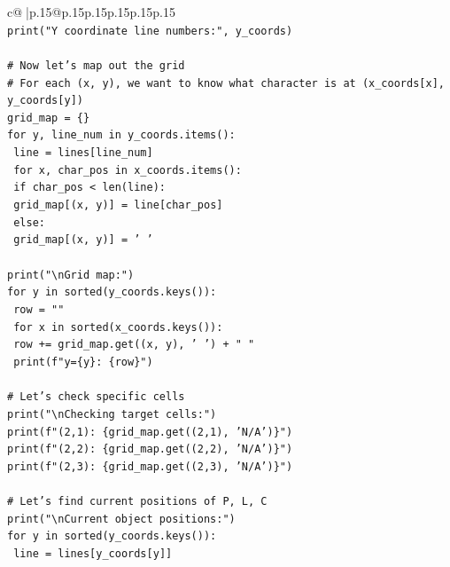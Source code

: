 \documentclass{article}
\begin{document}
{\begin{supertabular}{c@{$\;$}|p{.15\linewidth}@{}p{.15\linewidth}p{.15\linewidth}p{.15\linewidth}p{.15\linewidth}p{.15\linewidth}}
{{{\\ 
\texttt{print("Y coordinate line numbers:", y\_coords)} \\
\\ 
\texttt{\# Now let's map out the grid} \\
\texttt{\# For each (x, y), we want to know what character is at (x\_coords{[}x{]}, y\_coords{[}y{]})} \\
\texttt{grid\_map = \{\}} \\
\texttt{for y, line\_num in y\_coords.items():} \\
\texttt{    line = lines{[}line\_num{]}} \\
\texttt{    for x, char\_pos in x\_coords.items():} \\
\texttt{        if char\_pos < len(line):} \\
\texttt{            grid\_map{[}(x, y){]} = line{[}char\_pos{]}} \\
\texttt{        else:} \\
\texttt{            grid\_map{[}(x, y){]} = ' '} \\
\\ 
\texttt{print("\textbackslash{}nGrid map:")} \\
\texttt{for y in sorted(y\_coords.keys()):} \\
\texttt{    row = ""} \\
\texttt{    for x in sorted(x\_coords.keys()):} \\
\texttt{        row += grid\_map.get((x, y), ' ') + " "} \\
\texttt{    print(f"y=\{y\}: \{row\}")} \\
\\ 
\texttt{\# Let's check specific cells} \\
\texttt{print("\textbackslash{}nChecking target cells:")} \\
\texttt{print(f"(2,1): \{grid\_map.get((2,1), 'N/A')\}")} \\
\texttt{print(f"(2,2): \{grid\_map.get((2,2), 'N/A')\}")} \\
\texttt{print(f"(2,3): \{grid\_map.get((2,3), 'N/A')\}")} \\
\\ 
\texttt{\# Let's find current positions of P, L, C} \\
\texttt{print("\textbackslash{}nCurrent object positions:")} \\
\texttt{for y in sorted(y\_coords.keys()):} \\
\texttt{    line = lines{[}y\_coords{[}y{]}{]}} \\
}}}
\end{supertabular}}
\end{document}
